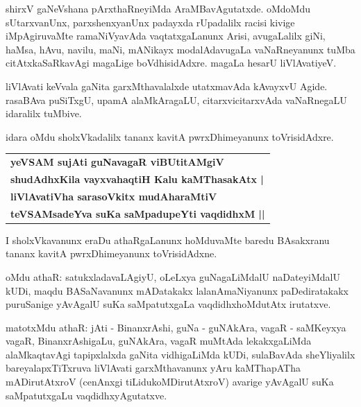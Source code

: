 shirxV gaNeVshana pArxthaRneyiMda AraMBavAgutatxde. oMdoMdu sUtarxvanUnx, parxshenxyanUnx padayxda rUpadalilx racisi kivige iMpAgiruvaMte ramaNiVyavAda vaqtatxgaLanunx Arisi, avugaLalilx giNi, haMsa, hAvu, navilu, maNi, mANikayx modalAdavugaLa vaNaRneyanunx tuMba citAtxkaSaRkavAgi magaLige boVdhisidAdxre. magaLa hesarU liVlAvatiyeV.

liVlAvati keVvala gaNita garxMthavalalxde utatxmavAda kAvayxvU Agide. rasaBAva puSiTxgU, upamA alaMkAragaLU, citarxvicitarxvAda vaNaRnegaLU idaralilx tuMbive.

idara oMdu sholxVkadalilx tananx kavitA pwrxDhimeyanunx toVrisidAdxre.
\begin{center}
\begin{tabular}{l}
{\bf yeVSAM sujAti guNavagaR viBUtitAMgiV}\\
{\bf shudAdhxKila vayxvahaqtiH Kalu kaMThasakAtx |}\\
{\bf liVlAvatiVha sarasoVkitx mudAharaMtiV}\\
{\bf teVSAMsadeYva suKa saMpadupeYti vaqdidhxM ||}
\end{tabular}
\end{center}

I sholxVkavanunx eraDu athaRgaLanunx hoMduvaMte baredu BAsakxranu tananx kavitA pwrxDhimeyanunx toVrisidAdxne.

oMdu athaR: satukxladavaLAgiyU, oLeLxya guNagaLiMdalU naDateyiMdalU kUDi, maqdu BASaNavanunx mADatakakx lalanAmaNiyanunx paDediratakakx puruSanige yAvAgalU suKa saMpatutxgaLa vaqdidhxhoMdutAtx irutatxve.

matotxMdu athaR: jAti - BinanxrAshi, guNa - guNAkAra, vagaR - saMKeyxya vagaR, BinanxrAshigaLu, guNAkAra, vagaR muMtAda lekakxgaLiMda alaMkaqtavAgi tapipxlalxda gaNita vidhigaLiMda kUDi, sulaBavAda sheYliyalilx bareyalapxTiTxruva liVlAvati garxMthavanunx yAru kaMThapATha mADirutAtxroV (cenAnxgi tiLidukoMDirutAtxroV) avarige yAvAgalU suKa saMpatutxgaLu vaqdidhxyAgutatxve.



